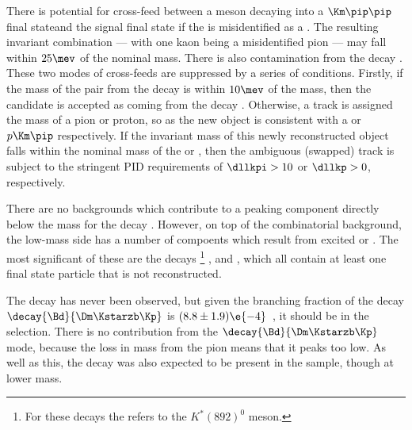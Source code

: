 There is potential for cross-feed between a \Dp meson decaying into a $\Km\pip\pip$ final stateand
the signal \Ds final state if the \pip is misidentified as a \Kp.
The resulting invariant \kkpi combination --- with one kaon being a misidentified pion --- may fall
within $25\mev$ of the nominal \Ds mass.
There is also contamination from the decay .
These two modes of cross-feeds are suppressed by a series of conditions.
Firstly, if the mass of the \kk pair from the \Ds decay is within $10\mev$ of the \phii mass, then
the candidate is accepted as coming from the decay \decay{\Ds}{\kkpi}.
Otherwise, a track is assigned the mass of a pion or proton, so as the new object is consistent
with a \kkpi or $p\Km\pip$ respectively.
If the invariant mass of this newly reconstructed object falls within the nominal mass of the \Dp
or \Lc, then the ambiguous (swapped) track is subject to the stringent PID requirements of
$\dllkpi>10$ or $\dllkp>0$, respectively.


There are no backgrounds which contribute to a peaking component directly below the \Bp mass for
the decay \btodsphi.
However, on top of the combinatorial background, the low-mass side has a number of compoents which
result from excited \Dssp or \Kstarz.
The most significant of these are the decays
\footnote{
  For these decays the \Kstarz refers to the $K^*(892)^0$ meson.
}
\btodsstrphi, \bstodskstrk and \bstodsstrkstrk, which all contain at least one final state particle
that is not reconstructed.

The decay \bstodskstrk has never been observed, but given the branching fraction of the decay
$\decay{\Bd}{\Dm\Kstarzb\Kp}$ is $(8.8\pm1.9)\e{-4}$~\cite{PDG2012}, it should be in the
\btodsphi selection.
There is no contribution from the $\decay{\Bd}{\Dm\Kstarzb\Kp}$ mode, because the loss in mass from
the pion means that it peaks too low.
As well as this, the decay \bstodsstrkstrk was also expected to be present in the sample, though at
lower mass.





